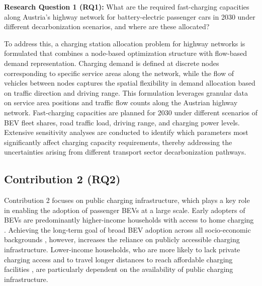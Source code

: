     \textbf{Research Question 1 (RQ1):} What are the required fast-charging capacities along Austria's highway network for battery-electric passenger cars in 2030 under different decarbonization scenarios, and where are these allocated?

    To address this, a charging station allocation problem for highway networks is formulated that combines a node-based optimization structure with flow-based demand representation. Charging demand is defined at discrete nodes corresponding to specific service areas along the network, while the flow of vehicles between nodes captures the spatial flexibility in demand allocation based on traffic direction and driving range. This formulation leverages granular data on service area positions and traffic flow counts along the Austrian highway network. Fast-charging capacities are planned for 2030 under different scenarios of \ac{BEV} fleet shares, road traffic load, driving range, and charging power levels. Extensive sensitivity analyses are conducted to identify which parameters most significantly affect charging capacity requirements, thereby addressing the uncertainties arising from different transport sector decarbonization pathways.

    
    \subsection{Contribution 2 (RQ2)}

    

    Contribution 2 focuses on public charging infrastructure, which plays a key role in enabling the adoption of passenger \acp{BEV} at a large scale. Early adopters of \acp{BEV} are predominantly higher-income households with access to home charging \cite{BRUCKMANN2021102615}. Achieving the long-term goal of broad \ac{BEV} adoption across all socio-economic backgrounds \cite{HOPKINS2023113398}, however, increases the reliance on publicly accessible charging infrastructure. Lower-income households, who are more likely to lack private charging access and to travel longer distances to reach affordable charging facilities \cite{TATTINI2018265}, are particularly dependent on the availability of public charging infrastructure.

